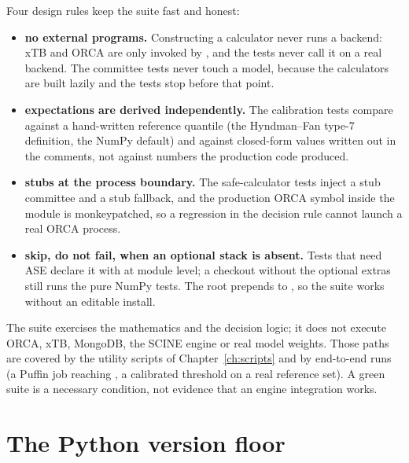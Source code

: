Four design rules keep the suite fast and honest:

\begin{itemize}
  \item \textbf{no external programs.}  Constructing a calculator never runs
        a backend: xTB and ORCA are only invoked by , and
        the tests never call it on a real backend.  The committee tests never
        touch a model, because the calculators are built lazily and the
        tests stop before that point.
  \item \textbf{expectations are derived independently.}  The calibration
        tests compare against a hand-written reference quantile (the
        Hyndman--Fan type-7 definition, the NumPy default) and against
        closed-form values written out in the comments, not against numbers
        the production code produced.
  \item \textbf{stubs at the process boundary.}  The safe-calculator tests
        inject a stub committee and a stub fallback, and the production ORCA
        symbol inside the module is monkeypatched, so a regression in the
        decision rule cannot launch a real ORCA process.
  \item \textbf{skip, do not fail, when an optional stack is absent.}  Tests
        that need ASE declare it with  at module
        level; a checkout without the optional extras still runs the pure
        NumPy tests.  The root  prepends  to
        , so the suite works without an editable install.
\end{itemize}

\begin{refusalbox}
The suite exercises the mathematics and the decision logic; it does not
execute ORCA, xTB, MongoDB, the SCINE engine or real model weights.  Those
paths are covered by the utility scripts of Chapter~\ref{ch:scripts} and by
end-to-end runs (a Puffin job reaching , a calibrated
threshold on a real reference set).  A green suite is a necessary condition,
not evidence that an engine integration works.
\end{refusalbox}

\section{The Python version floor}
\label{sec:dev-floor}

